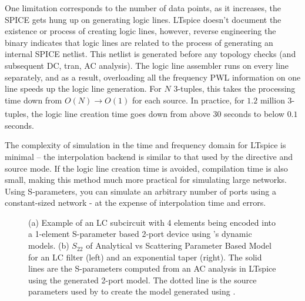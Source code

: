 One limitation corresponds to the number of data points, as it increases, the SPICE
gets hung up on generating logic lines. LTspice doesn't document the existence or process
of creating logic lines, however, reverse engineering the binary indicates that logic lines
are related to the process of generating an internal SPICE netlist. This netlist is generated
before any topology checks (and subsequent DC, tran, AC analysis). The logic line assembler runs
on every line separately, and as a result, overloading all the frequency PWL information on
one line speeds up the logic line generation. For $N$ 3-tuples, this takes the processing time
down from $O(N)\xrightarrow[]{} O(1)$ for each source. In practice, for $1.2$ million 3-tuples,
the logic line creation time goes down from above $30$ seconds to below $0.1$ seconds.

The complexity of simulation in the time and frequency domain for LTspice is minimal -- the 
interpolation backend is similar to that used by the  directive and  source mode.
If the logic line creation time is avoided, compilation time is also small, making this method
much more practical for simulating large networks. Using S-parameters, you can simulate an arbitrary
number of ports using a constant-sized network - at the expense of interpolation time and errors. 

\begin{figure}
    \centering

    
    \caption{(a) Example of an LC subcircuit with 4 elements being encoded into a 1-element
    S-parameter based 2-port device using 's dynamic models.
    (b) $S_{22}$ of Analytical vs Scattering Parameter Based Model
    for an LC filter (left) and an exponential taper (right). The solid lines are the S-parameters
    computed from an AC analysis in LTspice using the  generated 2-port model. The 
    dotted line is the source parameters used by  to create the model generated
    using .}
\end{figure}


